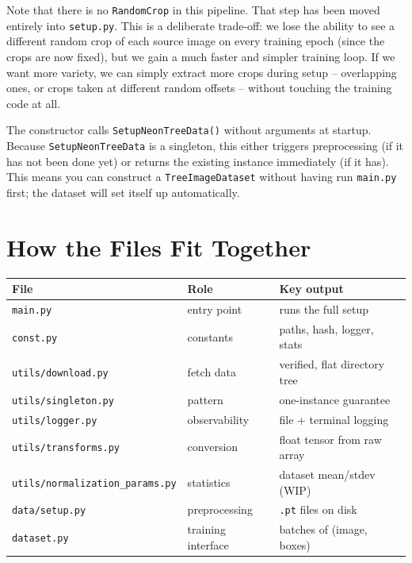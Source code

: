 \documentclass[11pt, a4paper]{article}
\newenvironment{note}{%
  \begin{tcolorbox}[
    colback=notebg, colframe=noteframe,
    fonttitle=\bfseries, title=Note,
    breakable, enhanced
  ]
}{%
  \end{tcolorbox}
}
\begin{document}
Note that there is no \texttt{RandomCrop} in this pipeline. That step has been
moved entirely into \texttt{setup.py}. This is a deliberate trade-off: we lose
the ability to see a different random crop of each source image on every
training epoch (since the crops are now fixed), but we gain a much faster and
simpler training loop. If we want more variety, we can simply extract more
crops during setup -- overlapping ones, or crops taken at different random
offsets -- without touching the training code at all.

\begin{note}
  The constructor calls \texttt{SetupNeonTreeData()} without arguments at
  startup. Because \texttt{SetupNeonTreeData} is a singleton, this either
  triggers preprocessing (if it has not been done yet) or returns the existing
  instance immediately (if it has). This means you can construct a
  \texttt{TreeImageDataset} without having run \texttt{main.py} first; the
  dataset will set itself up automatically.
\end{note}

\section{How the Files Fit Together}

\begin{center}
  \begin{tabular}{lll}
    \toprule
    \textbf{File}                           & \textbf{Role}      & \textbf{Key output}           \\
    \midrule
    \texttt{main.py}                        & entry point        & runs the full setup           \\
    \texttt{const.py}                       & constants          & paths, hash, logger, stats    \\
    \texttt{utils/download.py}              & fetch data         & verified, flat directory tree \\
    \texttt{utils/singleton.py}             & pattern            & one-instance guarantee        \\
    \texttt{utils/logger.py}                & observability      & file + terminal logging       \\
    \texttt{utils/transforms.py}            & conversion         & float tensor from raw array   \\
    \texttt{utils/normalization\_params.py} & statistics         & dataset mean/stdev (WIP)      \\
    \texttt{data/setup.py}                  & preprocessing      & \texttt{.pt} files on disk    \\
    \texttt{dataset.py}                     & training interface & batches of (image, boxes)     \\
    \bottomrule
  \end{tabular}
\end{center}
\end{document}
